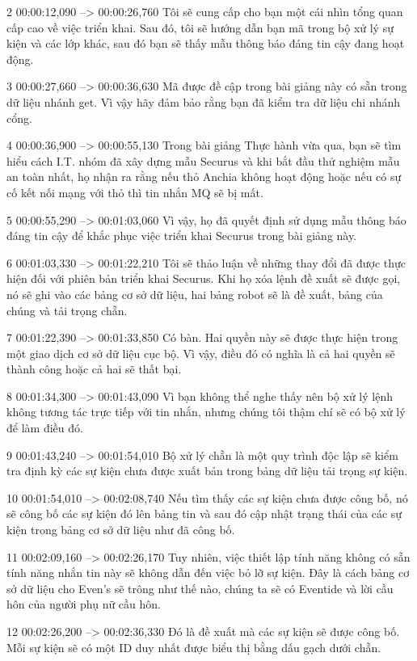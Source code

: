 2
00:00:12,090 --> 00:00:26,760
Tôi sẽ cung cấp cho bạn một cái nhìn tổng quan cấp cao về việc triển khai.  Sau đó, tôi sẽ hướng dẫn bạn mã trong bộ xử lý sự kiện và các lớp khác, sau đó bạn sẽ thấy mẫu thông báo đáng tin cậy đang hoạt động.

3
00:00:27,660 --> 00:00:36,630
Mã được đề cập trong bài giảng này có sẵn trong dữ liệu nhánh get.  Vì vậy hãy đảm bảo rằng bạn đã kiểm tra dữ liệu chi nhánh cổng.

4
00:00:36,900 --> 00:00:55,130
Trong bài giảng Thực hành vừa qua, bạn sẽ tìm hiểu cách I.T.  nhóm đã xây dựng mẫu Securus và khi bắt đầu thử nghiệm mẫu an toàn nhất, họ nhận ra rằng nếu thỏ Anchia không hoạt động hoặc nếu có sự cố kết nối mạng với thỏ thì tin nhắn MQ sẽ bị mất.

5
00:00:55,290 --> 00:01:03,060
Vì vậy, họ đã quyết định sử dụng mẫu thông báo đáng tin cậy để khắc phục việc triển khai Securus trong bài giảng này.

6
00:01:03,330 --> 00:01:22,210
Tôi sẽ thảo luận về những thay đổi đã được thực hiện đối với phiên bản triển khai Securus.  Khi họ xóa lệnh đề xuất sẽ được gọi, nó sẽ ghi vào các bảng cơ sở dữ liệu, hai bảng robot sẽ là đề xuất, bảng của chúng và tải trọng chẵn.

7
00:01:22,390 --> 00:01:33,850
Có bàn.  Hai quyền này sẽ được thực hiện trong một giao dịch cơ sở dữ liệu cục bộ.  Vì vậy, điều đó có nghĩa là cả hai quyền sẽ thành công hoặc cả hai sẽ thất bại.

8
00:01:34,300 --> 00:01:43,090
Vì bạn không thể nghe thấy nên bộ xử lý lệnh không tương tác trực tiếp với tin nhắn, nhưng chúng tôi thậm chí sẽ có bộ xử lý để làm điều đó.

9
00:01:43,240 --> 00:01:54,010
Bộ xử lý chẵn là một quy trình độc lập sẽ kiểm tra định kỳ các sự kiện chưa được xuất bản trong bảng dữ liệu tải trọng sự kiện.

10
00:01:54,010 --> 00:02:08,740
Nếu tìm thấy các sự kiện chưa được công bố, nó sẽ công bố các sự kiện đó lên bảng tin và sau đó cập nhật trạng thái của các sự kiện trong bảng cơ sở dữ liệu như đã công bố.

11
00:02:09,160 --> 00:02:26,170
Tuy nhiên, việc thiết lập tính năng không có sẵn tính năng nhắn tin này sẽ không dẫn đến việc bỏ lỡ sự kiện.  Đây là cách bảng cơ sở dữ liệu cho Even's sẽ trông như thế nào, chúng ta sẽ có Eventide và lời cầu hôn của người phụ nữ cầu hôn.

12
00:02:26,200 --> 00:02:36,330
Đó là đề xuất mà các sự kiện sẽ được công bố.  Mỗi sự kiện sẽ có một ID duy nhất được biểu thị bằng dấu gạch dưới chẵn.

